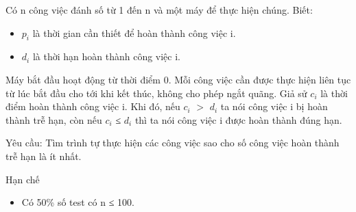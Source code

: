 Có n công việc đánh số từ 1 đến n và một máy để thực hiện chúng. Biết:  
\begin{itemize}
	\item     $p_{i}$    là thời gian cần thiết để hoàn thành công việc i.   
	\item     $d_{i}$    là thời hạn hoàn thành công việc i.   
\end{itemize}

   Máy bắt đầu hoạt động từ thời điểm 0. Mỗi công việc cần được thực hiện liên tục từ lúc bắt đầu cho tới khi kết thúc, không cho phép ngắt quãng. Giả sử $c_{i}$   là thời điểm hoàn thành công việc i. Khi đó, nếu $c_{i}$   $>$  $d_{i}$   ta nói công việc i bị hoàn thành trễ hạn, còn nếu  $c_{i}$   ≤ $d_{i}$   thì ta nói công việc i được hoàn thành đúng hạn.  

   Yêu cầu: Tìm trình tự thực hiện các công việc sao cho số công việc hoàn thành trễ hạn là ít nhất.  

Hạn chế
\begin{itemize}
	\item     Có 50\% số test có n ≤ 100.   
\end{itemize}